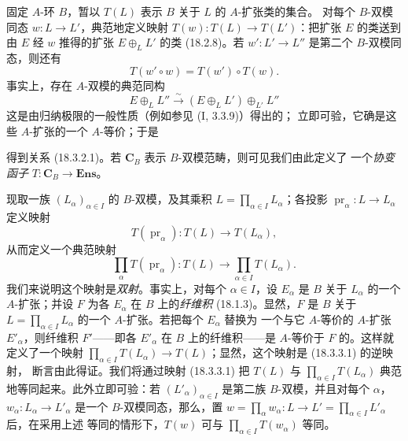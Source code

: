 \begin{env}[18.3.2]
\label{0.18.3.2-fr}
固定 $A$-环 $B$，暂以 $T(L)$ 表示 $B$ 关于 $L$ 的 $A$-扩张类的集合。
对每个 $B$-双模同态 $w:L\to L'$，典范地定义映射
$T(w):T(L)\to T(L')$：把扩张 $E$ 的类送到由 $E$ 经 $w$ 推得的扩张
$E\oplus_LL'$ 的类 (18.2.8)。若 $w':L'\to L''$ 是第二个 $B$-双模同态，则还有
\begin{equation}
\label{0.18.3.2.1-fr}
\tag{18.3.2.1}
  T(w'\circ w)=T(w')\circ T(w).
\end{equation}
事实上，存在 $A$-双模的典范同构
\[
  E\oplus_LL''\xrightarrow{\sim}(E\oplus_LL')\oplus_{L'}L''
\]
这是由归纳极限的一般性质（例如参见
($\mathrm{I}$, 3.3.9)）得出的；
立即可验，它确是这些 $A$-扩张的一个 $A$-等价；于是


得到关系 (18.3.2.1)。若 $\mathbf C_B$ 表示 $B$-双模范畴，则可见我们由此定义了
一个\emph{协变函子} $T:\mathbf C_B\to\mathbf{Ens}$。
\end{env}

\begin{env}[18.3.3]
\label{0.18.3.3-fr}
现取一族 $(L_\alpha)_{\alpha\in I}$ 的 $B$-双模，及其乘积
$L=\prod_{\alpha\in I}L_\alpha$；各投影
$\operatorname{pr}_\alpha:L\to L_\alpha$ 定义映射
\[
  T(\operatorname{pr}_\alpha):T(L)\to T(L_\alpha),
\]
从而定义一个典范映射
\begin{equation}
\label{0.18.3.3.1-fr}
\tag{18.3.3.1}
  \prod_\alpha T(\operatorname{pr}_\alpha):T(L)
  \longrightarrow\prod_{\alpha\in I}T(L_\alpha).
\end{equation}
我们来说明这个映射是\emph{双射}。事实上，对每个 $\alpha\in I$，设
$E_\alpha$ 是 $B$ 关于 $L_\alpha$ 的一个 $A$-扩张；并设 $F$ 为各
$E_\alpha$ 在 $B$ 上的\emph{纤维积} (18.1.3)。显然，$F$ 是 $B$ 关于
$L=\prod_{\alpha\in I}L_\alpha$ 的一个 $A$-扩张。若把每个 $E_\alpha$ 替换为
一个与它 $A$-等价的 $A$-扩张 $E'_\alpha$，则纤维积 $F'$——即各
$E'_\alpha$ 在 $B$ 上的纤维积——是 $A$-等价于 $F$ 的。这样就定义了一个映射
$\prod_{\alpha\in I}T(L_\alpha)\to T(L)$；显然，这个映射是 (18.3.3.1) 的逆映射，
断言由此得证。我们将通过映射 (18.3.3.1) 把 $T(L)$ 与
$\prod_{\alpha\in I}T(L_\alpha)$ 典范地等同起来。此外立即可验：若
$(L'_\alpha)_{\alpha\in I}$ 是第二族 $B$-双模，并且对每个 $\alpha$，
$w_\alpha:L_\alpha\to L'_\alpha$ 是一个 $B$-双模同态，那么，置
$w=\prod_\alpha w_\alpha:L\to L'=\prod_{\alpha\in I}L'_\alpha$ 后，在采用上述
等同的情形下，$T(w)$ 可与 $\prod_{\alpha\in I}T(w_\alpha)$ 等同。
\end{env}

